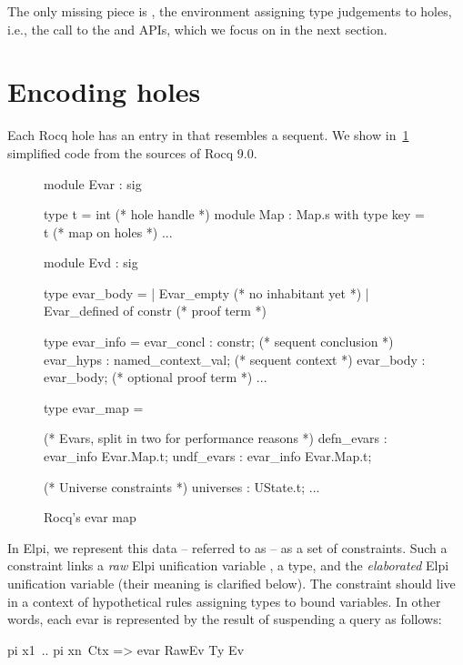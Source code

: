 \documentclass{these-ISSS}
\newenvironment{elpicode}
  {\VerbatimEnvironment\begin{elpibox}\begin{xelpicode}}{\end{xelpicode}
\end{elpibox}}
\newenvironment{ocamlcode}
  {\VerbatimEnvironment\begin{ocamlbox}\begin{xocamlcode}}{\end{xocamlcode}
\end{ocamlbox}}
\begin{document}
The only missing piece is , the environment assigning type
judgements to holes, i.e., the call to the  and
 APIs, which we focus on in the next section.

\section{Encoding holes}\label{sec:hoasholes}


Each Rocq hole has an entry in  that resembles a sequent.
We show in~\cref{fig:sigma} simplified code from the sources of Rocq 9.0.

\begin{figure}[h]
\begin{ocamlcode}
module Evar : sig

  type t = int                             (* hole handle    *)
  module Map : Map.s with type key = t     (* map on holes   *)
  ...

module Evd : sig

  type evar_body =
    | Evar_empty                      (* no inhabitant yet   *)
    | Evar_defined of constr          (* proof term          *)

  type evar_info = {
    evar_concl : constr;              (* sequent conclusion  *)
    evar_hyps  : named_context_val;   (* sequent context     *)
    evar_body  : evar_body;           (* optional proof term *)
    ...
  }

  type evar_map = {
    (* Evars, split in two for performance reasons *)
    defn_evars : evar_info Evar.Map.t;
    undf_evars : evar_info Evar.Map.t;

    (* Universe constraints *)
    universes  : UState.t;
    ...
  }
\end{ocamlcode}
\caption{Rocq's evar map\label{fig:sigma}}
\end{figure}

In Elpi, we represent this data -- referred to as  -- as a set of
 constraints. Such a constraint links a \emph{raw} Elpi unification
variable , a type, and the \emph{elaborated} Elpi unification variable
 (their meaning is clarified below).
The constraint should live in a context of hypothetical rules 
assigning types to bound variables. In other words, each evar is represented
by the result of suspending a query as follows:

\begin{elpicode}
  pi x1\ .. pi xn\ Ctx =>
    evar RawEv Ty Ev
\end{elpicode}
\end{document}
